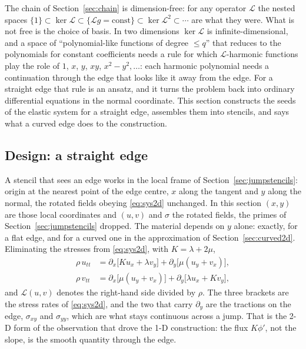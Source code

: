 \documentclass[11pt]{amsart}
\theoremstyle{definition}
\theoremstyle{remark}
\newcommand{\px}{\partial_x}
\newcommand{\py}{\partial_y}
\begin{document}
The chain of Section~\ref{sec:chain} is dimension-free: for any operator
$\mathcal{L}$ the nested spaces $\{1\} \subset \ker \mathcal{L} \subset
\{\mathcal{L} g = \mathrm{const}\} \subset \ker \mathcal{L}^2 \subset
\cdots$ are what they were. What is not free is the choice of basis. In
two dimensions $\ker \mathcal{L}$ is infinite-dimensional, and a space of
``polynomial-like functions of degree $\le q$'' that reduces to the
polynomials for constant coefficients needs a rule for which
$\mathcal{L}$-harmonic functions play the role of $1$, $x$, $y$, $xy$,
$x^2 - y^2, \ldots$: each harmonic polynomial needs a continuation through
the edge that looks like it away from the edge. For a straight edge that
rule is an ansatz, and it turns the problem back into ordinary
differential equations in the normal coordinate. This section constructs
the seeds of the elastic system for a straight edge, assembles them into
stencils, and says what a curved edge does to the construction.

\subsection{Design: a straight edge}
\label{sec:design2d}
A stencil that sees an edge works in the local frame of
Section~\ref{sec:jumpstencils}: origin at the nearest point of the edge
centre, $x$ along the tangent and $y$ along the normal, the rotated
fields obeying \eqref{eq:sys2d} unchanged. In this section $(x, y)$ are
those local coordinates and $(u, v)$ and $\sigma$ the rotated fields, the
primes of Section~\ref{sec:jumpstencils} dropped. The material depends on
$y$ alone: exactly, for a flat edge, and for a curved one in the
approximation of Section~\ref{sec:curved2d}. Eliminating the stresses
from \eqref{eq:sys2d}, with $K = \lambda + 2\mu$,
\begin{equation}
  \label{eq:L2d}
  \begin{aligned}
  \rho\, u_{tt} &= \px \bigl[ K u_x + \lambda v_y \bigr]
    + \py \bigl[ \mu (u_y + v_x) \bigr], \\
  \rho\, v_{tt} &= \px \bigl[ \mu (u_y + v_x) \bigr]
    + \py \bigl[ \lambda u_x + K v_y \bigr],
  \end{aligned}
\end{equation}
and $\mathcal{L}(u, v)$ denotes the right-hand side divided by $\rho$.
The three brackets are the stress rates of \eqref{eq:sys2d}, and the two
that carry $\py$ are the tractions on the edge, $\sigma_{xy}$ and
$\sigma_{yy}$, which are what stays continuous across a jump. That is the
2-D form of the observation that drove the 1-D construction: the flux
$K \phi'$, not the slope, is the smooth quantity through the edge.
\end{document}
